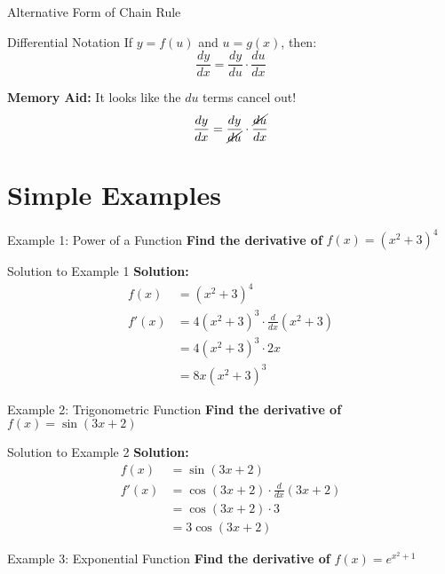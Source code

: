 \documentclass[aspectratio=169]{beamer}
\begin{document}
\begin{frame}{Alternative Form of Chain Rule}
\begin{block}{Differential Notation}
If $y = f(u)$ and $u = g(x)$, then:
\[\frac{dy}{dx} = \frac{dy}{du} \cdot \frac{du}{dx}\]
\end{block}

\textbf{Memory Aid:} It looks like the $du$ terms cancel out!
\[\frac{dy}{dx} = \frac{dy}{\cancel{du}} \cdot \frac{\cancel{du}}{dx}\]
\end{frame}

\section{Simple Examples}

\begin{frame}{Example 1: Power of a Function}
\textbf{Find the derivative of } $f(x) = (x^2 + 3)^4$
\end{frame}

\begin{frame}{Solution to Example 1}
\textbf{Solution:}
\[
\begin{aligned}
  f(x) &= (x^2 + 3)^4 \\
  f'(x) &= 4(x^2 + 3)^3 \cdot \frac{d}{dx}(x^2 + 3) \\
  &= 4(x^2 + 3)^3 \cdot 2x \\
  &= 8x(x^2 + 3)^3
\end{aligned}
\]
\end{frame}

\begin{frame}{Example 2: Trigonometric Function}
\textbf{Find the derivative of } $f(x) = \sin(3x + 2)$
\end{frame}

\begin{frame}{Solution to Example 2}
\textbf{Solution:}
\[
\begin{aligned}
  f(x) &= \sin(3x + 2) \\
  f'(x) &= \cos(3x + 2) \cdot \frac{d}{dx}(3x + 2) \\
  &= \cos(3x + 2) \cdot 3 \\
  &= 3\cos(3x + 2)
\end{aligned}
\]
\end{frame}

\begin{frame}{Example 3: Exponential Function}
\textbf{Find the derivative of } $f(x) = e^{x^2 + 1}$
\end{frame}
\end{document}
